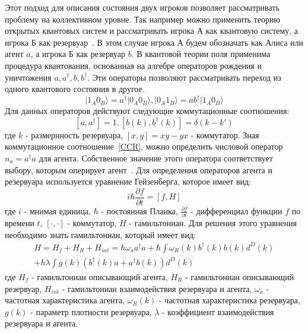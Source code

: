 Этот подход для описания состояния двух игроков позволяет рассматривать проблему на коллективном уровне.
Так например можно применить теорию открытых квантовых систем и рассматривать игрока А как квантовую
систему, а игрока Б как резервуар~\citep{bagarello2015operator,bagarello2015quantum}.
В этом случае игрока А будем обозначать как Алиса или агент $a$, а игрока Б как резервуар $b$.
В квантовой теории поля применима процедура квантования, основанная на алгебре операторов рождения
и уничтожения $a, a^{\dagger}, b, b^{\dagger}$.
Эти операторы позволяют рассматривать переход из одного квантового состояния в другое.
\begin{equation}
    \vert 1_{A} 0_{B} \rangle = a^{\dagger} \vert 0_{A} 0_{B} \rangle,
    \vert 0_{A} 1_{B} \rangle = a b^{\dagger} \vert 1_{A} 0_{B} \rangle
\end{equation}
Для данных операторов действуют следующие коммутационные соотношения:
\begin{equation}\label{CCR}
    [ a, a^{\dagger} ] = 1,
    [ b(k), b^{\dagger}(k) ] = \delta (k-k')
\end{equation}
где $k$ - размернность резервуара, $[x,y] = xy - yx$ - коммутатор.
Зная коммутационное соотношение~\eqref{CCR}, можно определить числовой оператор $n_a=a^{\dagger}a$
для агента.
Собственное значение этого оператора соответствует выбору, которым оперирует агент~\citep{bagarello2015quantum}.
Для определения операторов агента и резервуара используется уравнение Гейзенберга, которое имеет вид:
\begin{equation}
    i \hbar \frac{\partial f}{\partial t} = [f, H]
\end{equation}
где $i$ - мнимая единица, $\hbar$ - постоянная Планка, $\frac{\partial f}{\partial t}$ - дифференциал
функции $f$ по времени $t$, $[\cdot, \cdot]$ - коммутатор, $H$ - гамильтониан.
Для решения этого уравнения необходимо знать гамильтониан, который имеет вид:
\begin{multline}
    H = H_f + H_R + H_{int} = \hbar \omega_a a^{\dagger} a + \hbar \int \omega_{R}(k) b^{\dagger}(k) b(k) d^{D}(k) \\
    + \hbar \lambda \int g(k)(b^{\dagger}(k) a + a^{\dagger} b(k)) d^{D}(k)
\end{multline}
где $H_f$ - гамильтониан описывающий агента, $H_R$ - гамильтониан описывающий резервуар, $H_{int}$ -
гамильтониан взаимодействия резервуара и агента, $\omega_{a}$ - частотная характеристика агента,
$\omega_{R}(k)$ - частотная характеристика резервуара, $g(k)$ - параметр плотности резервуара,
$\lambda$ - коэффициент взаимодействия резервуара и агента.
